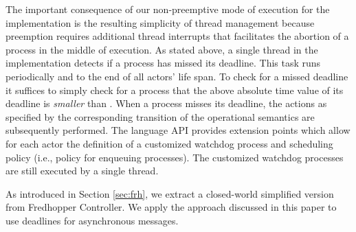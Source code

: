 The important consequence of our non-preemptive mode of execution 
for the implementation is the resulting simplicity of thread management
because preemption requires additional thread interrupts that facilitates the abortion of a process in the middle of execution.
% 
As stated above,  a single  thread in the implementation detects if a process has missed its deadline.
This task  runs periodically and to the end of all actors' life span.
To check for a missed deadline it suffices to simply check  for a process 
that the  above absolute time value of its deadline is \emph{smaller} than
.
When a process misses its deadline,  the actions as specified by the corresponding transition of the operational semantics are subsequently performed.
% 
The language API provides  extension points which allow for each actor
the definition of a customized watchdog process and scheduling policy
(i.e., policy for enqueuing processes).
The customized  watchdog processes are still  executed by a single thread.


As introduced in Section \ref{sec:frh}, we extract a closed-world simplified version from Fredhopper Controller.
We apply the approach discussed in this paper to use deadlines for asynchronous messages.

